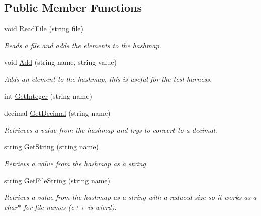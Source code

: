 \subsection*{Public Member Functions}
\begin{DoxyCompactItemize}
\item 
void \hyperlink{classnix_1_1Properties_a9e98d0d77432603f545c083738548a4f}{Read\+File} (string file)
\begin{DoxyCompactList}\small\item\em Reads a file and adds the elements to the hashmap. \end{DoxyCompactList}\item 
void \hyperlink{classnix_1_1Properties_a4bfd95419c6ef1eed012b5b16513553d}{Add} (string name, string value)
\begin{DoxyCompactList}\small\item\em Adds an element to the hashmap, this is useful for the test harness. \end{DoxyCompactList}\item 
int \hyperlink{classnix_1_1Properties_a97b73ede4ad7170b95a2e034a62567ec}{Get\+Integer} (string name)
\item 
decimal \hyperlink{classnix_1_1Properties_a8ffb0319273c9ab82427d0c28ad0531b}{Get\+Decimal} (string name)
\begin{DoxyCompactList}\small\item\em Retrieves a value from the hashmap and trys to convert to a decimal. \end{DoxyCompactList}\item 
string \hyperlink{classnix_1_1Properties_a5b56a3806ce0f6a63af87af775a0e633}{Get\+String} (string name)
\begin{DoxyCompactList}\small\item\em Retrievs a value from the hashmap as a string. \end{DoxyCompactList}\item 
string \hyperlink{classnix_1_1Properties_af159ee4252f5121556ded91b2de5fc40}{Get\+File\+String} (string name)
\begin{DoxyCompactList}\small\item\em Retrievs a value from the hashmap as a string with a reduced size so it works as a char$\ast$ for file names (c++ is wierd). \end{DoxyCompactList}\end{DoxyCompactItemize}
